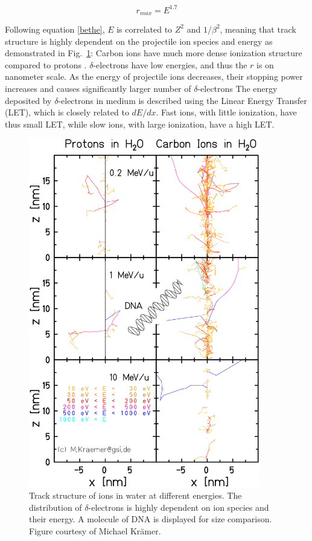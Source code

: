 \documentclass[type=dr, dr=rernat, accentcolor=tud7b,colorbacktitle, bigchapter, openright, twoside, 12pt ]{tudthesis}
\begin{document}
\begin{equation}
 r_{max} = E^{1.7}
\end{equation}

Following equation \ref{bethe}, $E$ is correlated to $Z^2$ and $1/\beta^2$, meaning that track structure is highly dependent on the projectile ion species and energy as demonstrated in Fig.~\ref{track}:
Carbon ions have much more dense ionization structure compared to protons \cite{!!}. $\delta$-electrons have low energies, and thus the $r$ is on nanometer scale. As the energy of projectile ions decreases, their
stopping power increases and causes significantly larger number of $\delta$-electrons The energy deposited by $\delta$-electrons in medium is described using the Linear Energy Transfer (LET), which is closely related to 
$dE/dx$. Fast ions, with little ionization, have thus small LET, while slow ions, with large ionization, have a high LET.


\begin{figure}[H]
\begin{center}
\includegraphics[width=0.9\textwidth]{./Images/trackstructure.png}
\caption{Track structure of ions in water at different energies. The distribution of $\delta$-electrons is highly dependent on ion species and their energy.
A molecule of DNA is displayed for size comparison. Figure courtesy of Michael Kr\"amer.}
\label{track}
\end{center}
\end{figure}
\end{document}
